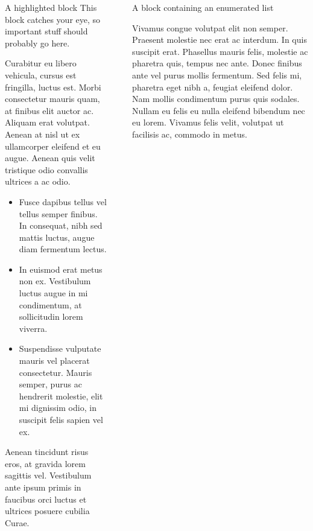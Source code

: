 \documentclass[final]{beamer}
\newlength{\sepwidth}
\newlength{\colwidth}
\newcommand{\separatorcolumn}{\begin{column}{\sepwidth}\end{column}}
\begin{document}
\begin{frame}[t]
\begin{columns}[t]
\begin{column}{\colwidth}
\begin{alertblock}{A highlighted block}
    This block catches your eye, so \alert{important stuff} should probably go
    here.

    Curabitur eu libero vehicula, cursus est fringilla, luctus est. Morbi consectetur mauris quam, at finibus elit auctor ac. Aliquam erat volutpat. Aenean at nisl ut ex ullamcorper eleifend et eu augue. Aenean quis velit tristique odio convallis ultrices a ac odio.

    \begin{itemize}

      \item \alert{Fusce dapibus tellus} vel tellus semper finibus. In consequat, nibh sed mattis luctus, augue diam fermentum lectus.

      \item \alert{In euismod erat metus} non ex. Vestibulum luctus augue in mi condimentum, at sollicitudin lorem viverra.

      \item \alert{Suspendisse vulputate} mauris vel placerat consectetur. Mauris semper, purus ac hendrerit molestie, elit mi dignissim odio, in
        suscipit felis sapien vel ex.

    \end{itemize}

    Aenean tincidunt risus eros, at gravida lorem sagittis vel. Vestibulum ante ipsum primis in faucibus orci luctus et ultrices posuere cubilia Curae.

  \end{alertblock}

\end{column}

\separatorcolumn

\begin{column}{\colwidth}

  \begin{block}{A block containing an enumerated list}

    Vivamus congue volutpat elit non semper. Praesent molestie nec erat ac interdum. In quis suscipit erat. \alert{Phasellus mauris felis, molestie ac pharetra quis}, tempus nec ante. Donec finibus ante vel purus mollis fermentum. Sed felis mi, pharetra eget nibh a, feugiat eleifend dolor. Nam mollis condimentum purus quis sodales. Nullam eu felis eu nulla eleifend bibendum nec eu lorem. Vivamus felis velit, volutpat ut facilisis ac, commodo in metus.

    \begin{enumerate}


\end{enumerate}
\end{block}
\end{column}
\end{columns}
\end{frame}
\end{document}
